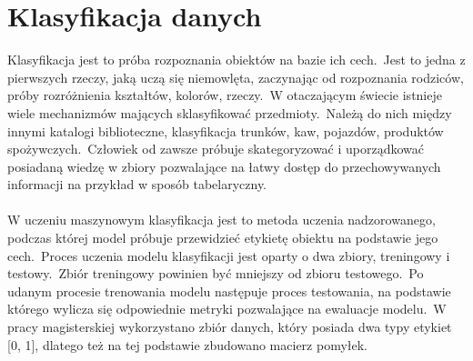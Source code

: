 \chapter{Klasyfikacja danych}

Klasyfikacja jest to próba rozpoznania obiektów na bazie ich cech.\ Jest to jedna z pierwszych rzeczy, jaką uczą się niemowlęta, zaczynając od rozpoznania rodziców, próby rozróżnienia kształtów, kolorów, rzeczy.\ W otaczającym świecie istnieje wiele mechanizmów mających sklasyfikować przedmioty.\ Należą do nich między innymi katalogi biblioteczne, klasyfikacja trunków, kaw, pojazdów, produktów spożywczych.\ Człowiek od zawsze próbuje skategoryzować i uporządkować posiadaną wiedzę w zbiory pozwalające na łatwy dostęp do przechowywanych informacji na przykład w sposób tabelaryczny.
\\ \\
W uczeniu maszynowym klasyfikacja jest to metoda uczenia nadzorowanego, podczas której model próbuje przewidzieć etykietę obiektu na podstawie jego cech.\ Proces uczenia modelu klasyfikacji jest oparty o dwa zbiory, treningowy i testowy.\ Zbiór treningowy powinien być mniejszy od zbioru testowego.\ Po udanym procesie trenowania modelu następuje proces testowania, na podstawie którego wylicza się odpowiednie metryki pozwalające na ewaluacje modelu.\ W pracy magisterskiej wykorzystano zbiór danych, który posiada dwa typy etykiet [0, 1], dlatego też na tej podstawie zbudowano macierz pomyłek.

\vfill
\pagebreak

